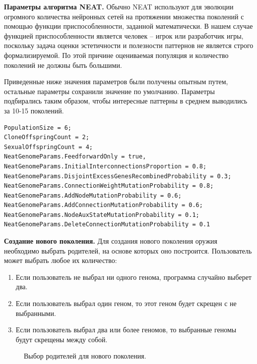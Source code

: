 \textbf{Параметры алгоритма NEAT.} Обычно NEAT используют для эволюции огромного количества нейронных сетей на протяжении множества поколений с помощью функции приспособленности, заданной математически. В нашем случае функцией приспособленности является человек -- игрок или разработчик игры, поскольку задача оценки эстетичности и полезности паттернов не является строго формализируемой. По этой причине оцениваемая популяция и количество поколений не должны быть большими.

Приведенные ниже значения параметров были получены опытным путем, остальные параметры сохранили значение по умолчанию. Параметры подбирались таким образом, чтобы интересные паттерны в среднем выводились за 10-15 поколений.

\begin{lstlisting}[caption={Параметры алгоритма эволюции}]
PopulationSize = 6;
CloneOffspringCount = 2;
SexualOffspringCount = 4;
NeatGenomeParams.FeedforwardOnly = true,
NeatGenomeParams.InitialInterconnectionsProportion = 0.8;
NeatGenomeParams.DisjointExcessGenesRecombinedProbability = 0.3;
NeatGenomeParams.ConnectionWeightMutationProbability = 0.8;
NeatGenomeParams.AddNodeMutationProbability = 0.6;
NeatGenomeParams.AddConnectionMutationProbability = 0.6;
NeatGenomeParams.NodeAuxStateMutationProbability = 0.1;
NeatGenomeParams.DeleteConnectionMutationProbability = 0.1
\end{lstlisting}



\textbf{Создание нового поколения.} Для создания нового поколения оружия необходимо выбрать родителей, на основе которых оно построится. Пользователь может выбрать любое их количество:

\begin{enumerate}[label=\textbullet]
    \item Если пользователь не выбрал ни одного генома, программа случайно выберет два.
    \item Если пользователь выбрал один геном, то этот геном будет скрещен с не выбранными.
    \item Если пользователь выбрал два или более геномов, то выбранные геномы будут скрещены между собой.
\end{enumerate}

\begin{figure}[ht]
    \begin{center}

        \caption{
            \label{SelectWeapon}
            Выбор родителей для нового поколения.}
    \end {center}
\end {figure}

